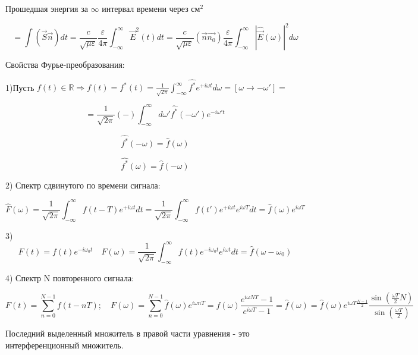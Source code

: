 \documentclass[12pt, a4paper]{report}
\begin{document}
Прошедшая энергия за \( \infty \)  интервал времени через см\( ^2 \)

\[ = \int (\vec{S}\vec{n})dt= \frac{c}{\sqrt{\mu \varepsilon}} \frac{\varepsilon}{ 4\pi }  \int_{-\infty}^{\infty} \vec{E} ^2(t)dt = \frac{c}{\sqrt{\mu \varepsilon}} ( \vec{n}\vec{n_0}) \frac{\varepsilon}{4 \pi} \int_{-\infty}^{\infty} |\hat{\vec{E}}(\omega) | ^2 d \omega  \] 

Свойства Фурье-преобразования: 

1)Пусть \( \displaystyle f(t) \in  \mathbb{R} \Rightarrow f(t)= f^*(t)= \frac{1}{\sqrt{2\pi}}\int_{-\infty}^{\infty} \hat{f^{*} }e ^{+i \omega t} d \omega =[\omega \to  - \omega ']   =  \)

\[ =\frac{1}{\sqrt{ 2 \pi }}(- )\int_{-\infty}^{\infty} d \omega ' \hat{f^{*} } ( -\omega ')e^{- i \omega' t}     \] 

\[ \hat{f^*} (- \omega) = \hat{f}(\omega)  \]

\[ \hat{f^*} ( \omega) = \hat{f}(-\omega) \] 

2) Спектр сдвинутого по времени сигнала:

\[  \hat{F}(\omega)=\frac{1}{\sqrt{2 \pi}}\int_{-\infty}^{\infty} f(t- T)e^{+ i \omega t }dt = \frac{1}{\sqrt{2\pi}} \int_{-\infty}^{\infty} f(t' )e^{+ i \omega t } e^{i \omega T} dt =\hat{f}(\omega)e^{i \omega T}         \]  

3) \[  F( t)= f(t) e^{- i \omega_0 t  }\quad  F(\omega)= \frac{1}{\sqrt{2 \pi}} \int_{-\infty}^{\infty}   f(t) e ^{- i \omega_0 t} e ^{i \omega t}dt  = \hat{f}( \omega - \omega_0) \]  

4) Спектр N повторенного сигнала: 

\[ F(t)= \sum_{n=0}^{N-1} f( t - nT); \quad F(\omega)= \sum _{n=0}^{N-1} \hat{f}(\omega) e^{i \omega n T} = f( \omega ) \frac{ e ^{i \omega NT} -1}{e ^{i \omega T} -1}  = \hat{f} ( \omega )= \hat{f}(\omega) e^{i \omega T \frac{ N-1 }{2} } \boxed{\frac{\sin \left( \frac{\omega T}{2}N  \right) }{\sin \left( \frac{\omega T}{2} \right)}}   \]

Последний выделенный  множитель в правой части уравнения - это интерференционный множитель.



\ifdefined\mainfile
\else
    
\end{document}
